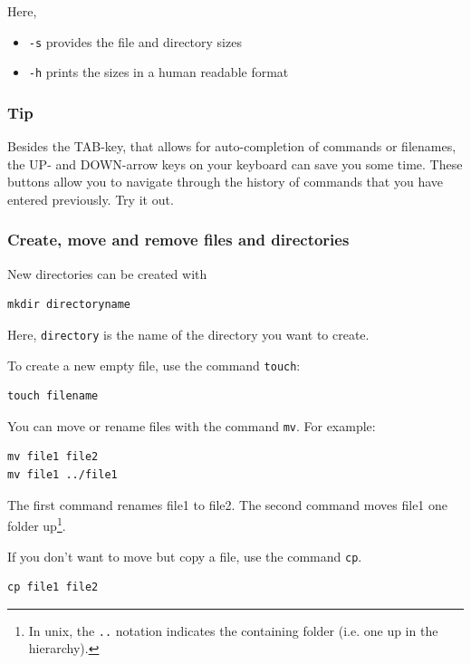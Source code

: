 \documentclass[11pt]{article}
\begin{document}
Here, 
\begin{itemize}
\item \texttt{-s} provides the file and directory sizes
\item \texttt{-h} prints the sizes in a human readable format
\end{itemize}

\subsubsection{Tip}
\label{sec-2-1-6}
Besides the TAB-key, that allows for auto-completion of commands or
filenames, the UP- and DOWN-arrow keys on your keyboard can save you
some time. These buttons allow you to navigate through the history of
commands that you have entered previously.  Try it out.

\subsubsection{Create, move and remove files and directories}
\label{sec-2-1-7}
New directories can be created with

\begin{verbatim}
mkdir directoryname
\end{verbatim}
Here, \texttt{directory} is the name of the directory you want to create.

To create a new empty file, use the command \texttt{touch}:

\begin{verbatim}
touch filename
\end{verbatim}

You can move or rename files with the command \texttt{mv}. For example:

\begin{verbatim}
mv file1 file2
mv file1 ../file1
\end{verbatim}

The first command renames file1 to file2. The second command moves
file1 one folder up\footnote{In unix, the \texttt{..} notation indicates the containing folder
(i.e. one up in the hierarchy).}.

If you don't want to move but copy a file, use the command \texttt{cp}.

\begin{verbatim}
cp file1 file2
\end{verbatim}
\end{document}
